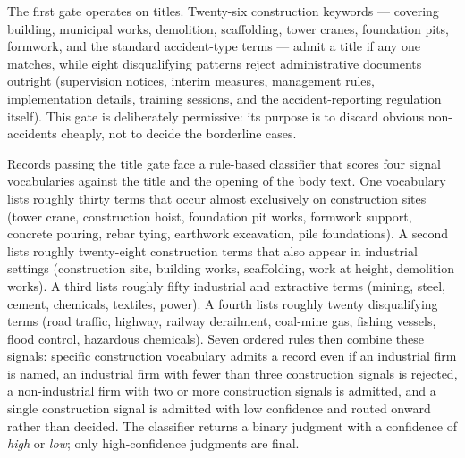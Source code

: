 \documentclass[11pt]{article}
\begin{document}
The first gate operates on titles. Twenty-six construction keywords --- covering building, municipal works, demolition, scaffolding, tower cranes, foundation pits, formwork, and the standard accident-type terms --- admit a title if any one matches, while eight disqualifying patterns reject administrative documents outright (supervision notices, interim measures, management rules, implementation details, training sessions, and the accident-reporting regulation itself). This gate is deliberately permissive: its purpose is to discard obvious non-accidents cheaply, not to decide the borderline cases.

Records passing the title gate face a rule-based classifier that scores four signal vocabularies against the title and the opening of the body text. One vocabulary lists roughly thirty terms that occur almost exclusively on construction sites (tower crane, construction hoist, foundation pit works, formwork support, concrete pouring, rebar tying, earthwork excavation, pile foundations). A second lists roughly twenty-eight construction terms that also appear in industrial settings (construction site, building works, scaffolding, work at height, demolition works). A third lists roughly fifty industrial and extractive terms (mining, steel, cement, chemicals, textiles, power). A fourth lists roughly twenty disqualifying terms (road traffic, highway, railway derailment, coal-mine gas, fishing vessels, flood control, hazardous chemicals). Seven ordered rules then combine these signals: specific construction vocabulary admits a record even if an industrial firm is named, an industrial firm with fewer than three construction signals is rejected, a non-industrial firm with two or more construction signals is admitted, and a single construction signal is admitted with low confidence and routed onward rather than decided. The classifier returns a binary judgment with a confidence of \textit{high} or \textit{low}; only high-confidence judgments are final.
\end{document}
